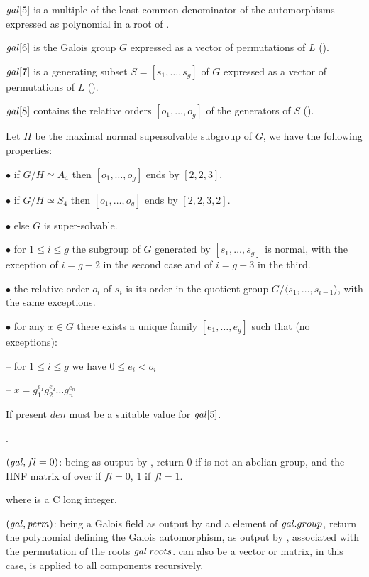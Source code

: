  $\hbox{\it gal\/}[5]$ is a multiple of the least common denominator of the
 automorphisms expressed as polynomial in a root of .

 $\hbox{\it gal\/}[6]$ is the Galois group $G$ expressed as a vector of
 permutations of $L$ ().

 $\hbox{\it gal\/}[7]$ is a generating subset $S=[s_1,\ldots,s_g]$ of $G$
 expressed as a vector of permutations of $L$ ().

 $\hbox{\it gal\/}[8]$ contains the relative orders $[o_1,\ldots,o_g]$ of
 the generators of $S$ ().

Let $H$ be the maximal normal supersolvable subgroup of $G$, we have the
following properties:

\quad$\bullet$ if $G/H\simeq A_4$ then $[o_1,\ldots,o_g]$ ends by
$[2,2,3]$.

\quad$\bullet$ if $G/H\simeq S_4$ then $[o_1,\ldots,o_g]$ ends by
$[2,2,3,2]$.

\quad$\bullet$ else $G$ is super-solvable.

\quad$\bullet$ for $1\leq i \leq g$ the subgroup of $G$ generated by
$[s_1,\ldots,s_g]$ is normal, with the exception of $i=g-2$ in the
second case and of $i=g-3$ in the third.

\quad$\bullet$ the relative order $o_i$ of $s_i$ is its order in the
quotient group $G/\langle s_1,\ldots,s_{i-1}\rangle$, with the same
exceptions.

\quad$\bullet$ for any $x\in G$ there exists a unique family
$[e_1,\ldots,e_g]$ such that (no exceptions):

-- for $1\leq i \leq g$ we have $0\leq e_i<o_i$

-- $x=g_1^{e_1}g_2^{e_2}\ldots g_n^{e_n}$

If present $den$ must be a suitable value for $\hbox{\it gal\/}[5]$.

.

$(\hbox{\it gal\/},{fl=0})$:  being as output by , return $0$ if
  is not an abelian group, and the HNF matrix of  over  if $fl=0$, $1$ if
 $fl=1$.

 where  is a C long integer.

$(\hbox{\it gal\/},\hbox{\it perm\/})$:  being a
Galois field as output by  and  a element of
$\hbox{\it gal\/}.group$, return the polynomial defining the Galois
automorphism, as output by , associated with the
permutation  of the roots $\hbox{\it gal\/}.roots$.  can
also be a vector or matrix, in this case,  is
applied to all components recursively.

